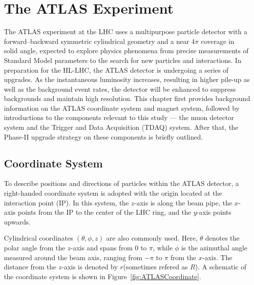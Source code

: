 \chapter{The ATLAS Experiment} \label{ch:ATLAS} 
The ATLAS experiment at the LHC uses a multipurpose particle detector with a forward–backward symmetric cylindrical geometry and a near 4$\pi$ coverage in solid angle, expected to explore physics phenomena from precise measurements of Standard Model parameters to the search for new particles and interactions. In preparation for the HL-LHC, the ATLAS detector is undergoing a series of upgrades. As the instantaneous luminosity increases, resulting in higher pile-up as well as the background event rates, the detector will be enhanced to suppress backgrounds and maintain high resolution. This chapter first provides background information on the ATLAS coordinate system and magnet system, followed by introductions to the components relevant to this study --- the muon detector system and the Trigger and Data Acquisition (TDAQ) system. After that, the Phase-II upgrade strategy on these components is briefly outlined.
\section{Coordinate System} \label{sec:CoordinateSystem}
To describe positions and directions of particles within the ATLAS detector, a right-handed coordinate system is adopted with the origin located at the interaction point (IP). In this system, the \(z\)-axis is along the beam pipe, the \(x\)-axis points from the IP to the center of the LHC ring, and the \(y\)-axis points upwards.

Cylindrical coordinates \((\theta, \phi, z)\) are also commonly used. Here, \(\theta\) denotes the polar angle from the \(z\)-axis and spans from \(0\) to \(\pi\), while \(\phi\) is the azimuthal angle measured around the beam axis, ranging from \(-\pi\) to \(\pi\) from the \(x\)-axis. The distance from the \(z\)-axis is denoted by \(r\)(sometimes refered as \(R\)). A schematic of the coordinate system is shown in Figure~\ref{fig:ATLASCoordinate}.

